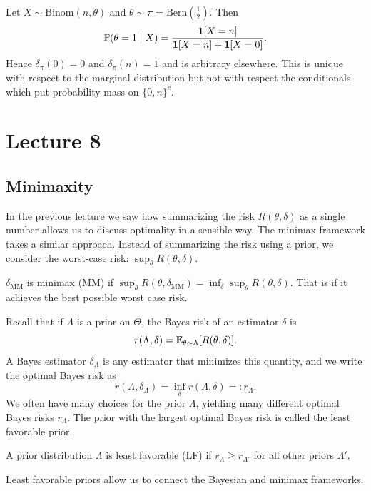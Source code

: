 \begin{example}
	Let $X \sim \text{Binom}(n, \theta)$ and $\theta \sim \pi = \text{Bern}(\frac{1}{2})$. Then \[
		\mathbb{P}(\theta = 1 \mid X) = \frac{\mathbf{1}[X=n]}{\mathbf{1}[X=n]+\mathbf{1}[X=0]}.
	\] Hence $\delta_\pi(0) = 0$ and $\delta_\pi(n) = 1$ and is arbitrary elsewhere. This is unique with respect to the marginal distribution but not with respect the conditionals which put probability mass on $\{0, n\}^c$.
\end{example}


\newpage
\section{Lecture 8}

\subsection{Minimaxity}

In the previous lecture we saw how summarizing the risk $R(\theta, \delta)$ as a single number allows us to discuss optimality in a sensible way. The minimax framework takes a similar approach. Instead of summarizing the risk using a prior, we consider the worst-case risk: $\sup_\theta R(\theta, \delta)$. 

\begin{definition}
	$\delta_{\text{MM}}$ is minimax (MM) if $\sup_\theta R(\theta, \delta_{\text{MM}}) = \inf_{\delta} \sup_\theta R(\theta, \delta)$. That is if it achieves the best possible worst case risk.
\end{definition}

\noindent Recall that if $\Lambda$ is a prior on $\Theta$, the Bayes risk of an estimator $\delta$ is
\[
	r(\Lambda, \delta) = \mathbb{E}_{\theta \sim \Lambda}[R(\theta, \delta)].
\]
A Bayes estimator $\delta_\Lambda$ is any estimator that minimizes this quantity, and we write the optimal Bayes risk as
\[
	r(\Lambda, \delta_\Lambda) = \inf_\delta r(\Lambda, \delta) =: r_\Lambda.
\]
We often have many choices for the prior $\Lambda$, yielding many different optimal Bayes risks $r_\Lambda$. The prior with the largest optimal Bayes risk is called the least favorable prior. 

\begin{definition}
	A prior distribution $\Lambda$ is least favorable (LF) if $r_\Lambda \ge r_{\Lambda'}$ for all other priors $\Lambda'$.
\end{definition}

\noindent Least favorable priors allow us to connect the Bayesian and minimax frameworks.

